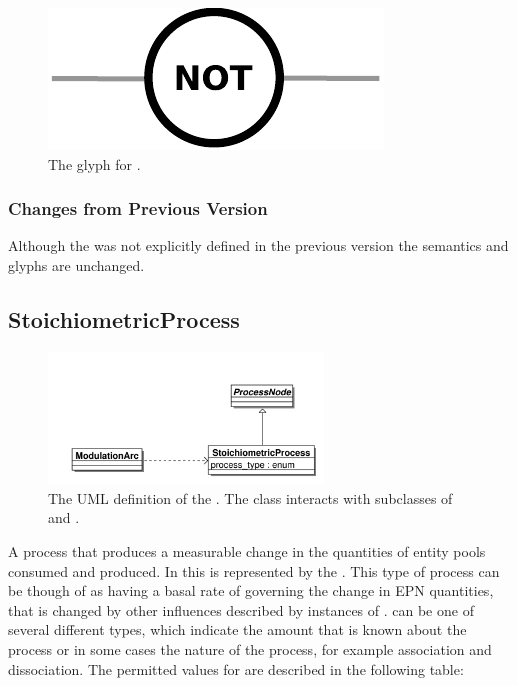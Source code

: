 \begin{figure}[H]
  \centering
  \includegraphics[scale = 0.5]{images/not}
  \caption{The \PD glyph for .}
  \label{fig:not}
\end{figure}

\subsubsection{Changes from Previous Version}

Although the  was not explicitly defined in
the previous version the semantics and glyphs are unchanged.


\subsection{StoichiometricProcess}
\label{defn:StoichiometricProcess}\label{sec:stoichiometricprocess}

\begin{figure}[htb]
  \centering
  \includegraphics[width = 0.65\textwidth]{images/stoichprocessuml}
  \caption{The UML definition of the
    . The class interacts with
    subclasses of  and .}
  \label{fig:stoichprocessuml}
\end{figure}
 
A process that produces a measurable change in the quantities of
entity pools consumed and produced. In \PDl this is represented by the
. This type of process can be though
of as having a basal rate of governing the change in EPN quantities,
that is changed by other influences described by instances of
.  can be one
of several different types, which indicate the amount that is known
about the process or in some cases the nature of the process, for
example association and dissociation. The permitted values for
 are described in the following table:

